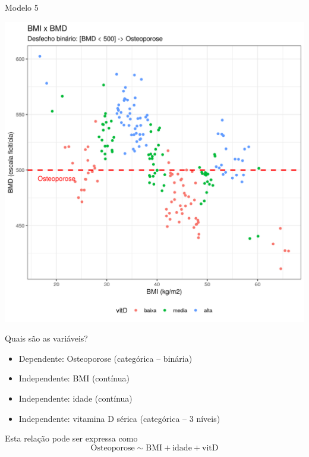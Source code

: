 \documentclass{beamer}
\begin{document}
\begin{frame}{\scriptsize Modelo 5}
  \begin{center}
    \includegraphics[height=.9\textheight]{Cap31-32/pratica-glm5}
  \end{center}
\end{frame}

\begin{frame}{\scriptsize Quais são as variáveis?}
  \begin{itemize}
    \footnotesize
  \item \alert{Dependente: Osteoporose (categórica -- binária)}
  \item Independente: BMI (contínua)
  \item Independente: idade (contínua)
  \item Independente: vitamina D sérica (categórica -- 3 níveis)
  \end{itemize}
  \vfill
  \begin{block}{Esta relação pode ser expressa como}
    \footnotesize
    \begin{displaymath}
      \text{Osteoporose} \sim \text{BMI} + \text{idade} +\text{vitD}
    \end{displaymath}
  \end{block}
\end{frame}
\end{document}

